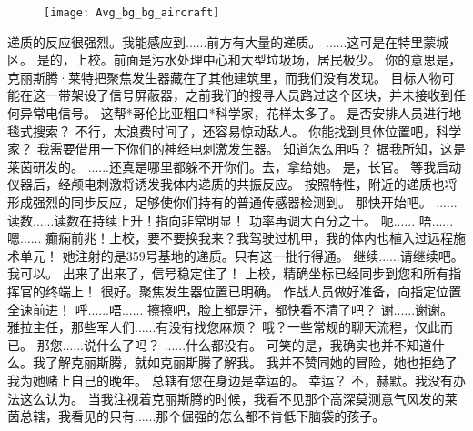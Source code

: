 \documentclass[openany]{book}
\begin{document}
\begin{figure}[h]
    \centering
    \texttt{[image: Avg\_bg\_bg\_aircraft]}
\end{figure}
\begin{dialogue}
     递质的反应很强烈。我能感应到......前方有大量的递质。
     ......这可是在特里蒙城区。
     是的，上校。前面是污水处理中心和大型垃圾场，居民极少。
     你的意思是，克丽斯腾·莱特把聚焦发生器藏在了其他建筑里，而我们没有发现。
     目标人物可能在这一带架设了信号屏蔽器，之前我们的搜寻人员路过这个区块，并未接收到任何异常电信号。
     这帮*哥伦比亚粗口*科学家，花样太多了。
     是否安排人员进行地毯式搜索？
     不行，太浪费时间了，还容易惊动敌人。
     你能找到具体位置吧，科学家？
     我需要借用一下你们的神经电刺激发生器。
     知道怎么用吗？
     据我所知，这是莱茵研发的。
     ......还真是哪里都躲不开你们。去，拿给她。
     是，长官。
     等我启动仪器后，经颅电刺激将诱发我体内递质的共振反应。
     按照特性，附近的递质也将形成强烈的同步反应，足够使你们持有的普通传感器检测到。
     那快开始吧。
     ......
     读数......读数在持续上升！指向非常明显！
     功率再调大百分之十。
     呃......
     唔......嗯......
     癫痫前兆！上校，要不要换我来？我驾驶过机甲，我的体内也植入过远程施术单元！
     她注射的是359号基地的递质。只有这一批行得通。
     继续......请继续吧。
     我可以。
     出来了出来了，信号稳定住了！
     上校，精确坐标已经同步到您和所有指挥官的终端上！
     很好。聚焦发生器位置已明确。
     作战人员做好准备，向指定位置全速前进！
     呼......唔......
     擦擦吧，脸上都是汗，都快看不清了吧？
     谢......谢谢。
     雅拉主任，那些军人们......有没有找您麻烦？
     哦？一些常规的聊天流程，仅此而已。
     那您......说什么了吗？
     ......什么都没有。
     可笑的是，我确实也并不知道什么。我了解克丽斯腾，就如克丽斯腾了解我。
     我并不赞同她的冒险，她也拒绝了我为她赌上自己的晚年。
     总辖有您在身边是幸运的。
     幸运？
     不，赫默。我没有办法这么认为。
     当我注视着克丽斯腾的时候，我看不见那个高深莫测意气风发的莱茵总辖，我看见的只有......那个倔强的怎么都不肯低下脑袋的孩子。

\end{dialogue}
\end{document}
